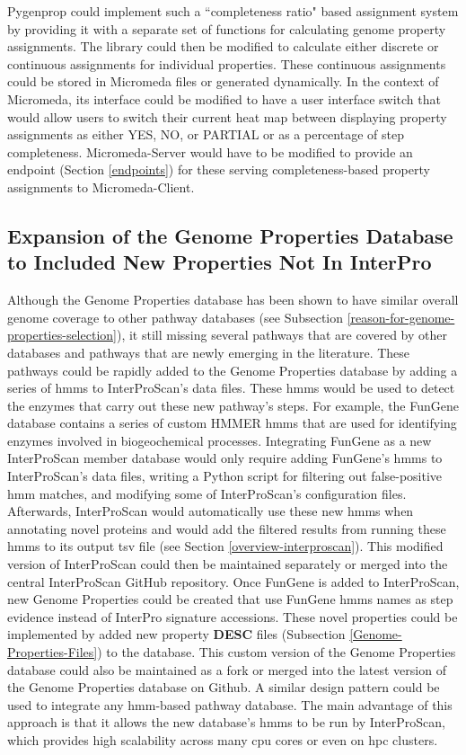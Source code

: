 Pygenprop could implement such a ``completeness ratio" based assignment system by providing it with a separate set of functions for calculating genome property assignments. The library could then be modified to calculate either discrete or continuous assignments for individual properties. These continuous assignments could be stored in Micromeda files or generated dynamically. In the context of Micromeda, its interface could be modified to have a user interface switch that would allow users to switch their current heat map between displaying property assignments as either YES, NO, or PARTIAL or as a percentage of step completeness. Micromeda-Server would have to be modified to provide an endpoint (Section \ref{endpoints}) for these serving completeness-based property assignments to Micromeda-Client.

\subsection{Expansion of the Genome Properties Database to Included New Properties Not In InterPro}

Although the Genome Properties database has been shown to have similar overall genome coverage to other pathway databases (see Subsection \ref{reason-for-genome-properties-selection}), it still missing several pathways that are covered by other databases and pathways that are newly emerging in the literature. These pathways could be rapidly added to the Genome Properties database by adding a series of \gls{hmm}s \cite{eddy2011accelerated} to InterProScan's data files. These \gls{hmm}s would be used to detect the enzymes that carry out these new pathway's steps. For example, the FunGene \cite{fish2013fungene} database contains a series of custom HMMER \cite{eddy2011accelerated} \gls{hmm}s that are used for identifying enzymes involved in biogeochemical processes. Integrating FunGene as a new InterProScan member database would only require adding FunGene's \gls{hmm}s to InterProScan's data files, writing a Python script for filtering out false-positive \gls{hmm} matches, and modifying some of InterProScan's configuration files. Afterwards, InterProScan would automatically use these new \gls{hmm}s when annotating novel proteins and would add the filtered results from running these \gls{hmm}s to its output \gls{tsv} file (see Section \ref{overview-interproscan}). This modified version of InterProScan could then be maintained separately or merged into the central InterProScan GitHub repository. Once FunGene is added to InterProScan, new Genome Properties could be created that use FunGene \gls{hmm}s names as step evidence instead of InterPro signature accessions. These novel properties could be implemented by added new property \textbf{DESC} files (Subsection \ref{Genome-Properties-Files}) to the database. This custom version of the Genome Properties database could also be maintained as a fork or merged into the latest version of the Genome Properties database on Github. A similar design pattern could be used to integrate any \gls{hmm}-based pathway database. The main advantage of this approach is that it allows the new database's \gls{hmm}s to be run by InterProScan, which provides high scalability across many \gls{cpu} cores or even on \gls{hpc} clusters.

